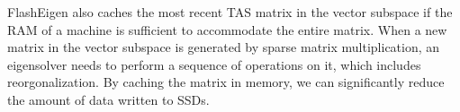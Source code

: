 FlashEigen also caches the most recent TAS matrix in the vector subspace if
the RAM of a machine is sufficient to accommodate the entire matrix.
When a new matrix in the vector subspace is generated by sparse matrix
multiplication, an eigensolver needs to perform a sequence of operations on it,
which includes reorgonalization. By caching the matrix in memory, we can
significantly reduce the amount of data written to SSDs.
